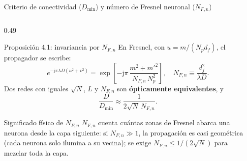 \documentclass[aspectratio=169,10pt]{beamer}
\newcommand{\jj}{\mathrm{j}}
\newcommand{\Dmin}{D_{\min}}
\begin{document}
\begin{frame}{Criterio de conectividad ($\Dmin$) y número de Fresnel neuronal ($N_{F,n}$)}
\begin{columns}[T,onlytextwidth]
\begin{column}{0.49\textwidth}
\begin{azulbox}{Proposición 4.1: invariancia por $N_{F,n}$}
      \scriptsize
      En Fresnel, con $u=m/(N_pd_f)$, el propagador se escribe:
      \[
        e^{-\jj\pi\lambda D(u^2+v^2)}
        =\exp\!\left[-\jj\pi\,\frac{m^2+m'^2}{N_{F,n}\,N_p^2}\right],
        \quad N_{F,n}\equiv\frac{d_f^2}{\lambda D}.
      \]
      Dos redes con iguales $\sqrt N$, $L$ y $N_{F,n}$ son \textbf{ópticamente equivalentes}, y
      \[
        \frac{D}{\Dmin}\approx\frac{1}{2\sqrt N\,N_{F,n}}.
      \]
    \end{azulbox}
    \vspace{2pt}
    \begin{caja}{Significado físico de $N_{F,n}$}
      \scriptsize
      $N_{F,n}$ cuenta cuántas zonas de Fresnel abarca una neurona desde la capa siguiente: si $N_{F,n}\gg 1$, la propagación es casi geométrica (cada neurona solo ilumina a su vecina); se exige $N_{F,n}\le 1/(2\sqrt N)$ para mezclar toda la capa.
    \end{caja}
  \end{column}
\end{columns}
\end{frame}
\end{document}
